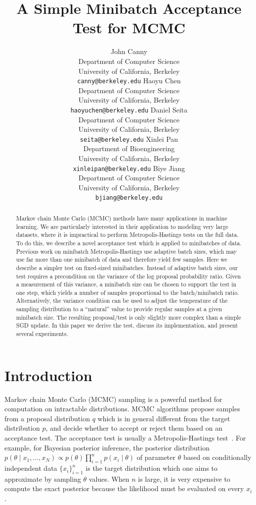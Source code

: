 \documentclass{article}
\title{A Simple Minibatch Acceptance Test for MCMC}
\author{
  John Canny \\
  Department of Computer Science \\
  University of California, Berkeley \\
  \texttt{canny@berkeley.edu}
  \And
  Haoyu Chen \\
  Department of Computer Science \\
  University of California, Berkeley \\
  \texttt{haoyuchen@berkeley.edu}
  \And
  Daniel Seita \\
  Department of Computer Science \\
  University of California, Berkeley \\
  \texttt{seita@berkeley.edu}
  \And
  Xinlei Pan \\
  Department of Bioengineering \\
  University of California, Berkeley \\
  \texttt{xinleipan@berkeley.edu}
  \And 
  Biye Jiang \\
  Department of Computer Science \\
  University of California, Berkeley \\
  \texttt{bjiang@berkeley.edu}
}
\begin{document}
\maketitle

\begin{abstract}
Markov chain Monte Carlo (MCMC) methods have many applications in
machine learning. We are particularly interested in their application
to modeling very large datasets, where it is impractical to
perform Metropolis-Hastings tests on the full data. To do this, we
describe a novel acceptance test which is applied to minibatches of
data. Previous work on minibatch Metropolis-Hastings use adaptive
batch sizes, which may use far more than one minibatch of data and therefore
yield few samples.  Here we describe a simpler test on fixed-sized
minibatches. Instead of adaptive batch sizes, our test requires a
precondition on the variance of the log proposal probability
ratio. Given a measurement of this variance, a minibatch size can be
chosen to support the test in one step, which yields a number of
samples proportional to the batch/minibatch ratio. Alternatively, the
variance condition can be used to adjust the temperature of the
sampling distribution to a ``natural'' value to provide regular
samples at a given minibatch size. The resulting proposal/test is only
slightly more complex than a simple SGD update. In this paper we
derive the test, discuss its implementation, and present several
experiments.
\end{abstract}



\section{Introduction}\label{sec:introduction}

Markov chain Monte Carlo (MCMC) sampling is a powerful method for
computation on intractable distributions. MCMC algorithms propose
samples from a proposal distribution $q$ which is in general different
from the target distribution $p$, and decide whether to accept or
reject them based on an acceptance test. The acceptance test is
usually a Metropolis-Hastings
test~\cite{Metropolis1953,hastings70}. For example, for Bayesian
posterior inference, the posterior distribution $p(\theta \mid x_1,
\ldots, x_N) \propto p(\theta)\prod_{i=1}^np(x_i \mid \theta)$ of
parameter $\theta$ based on conditionally independent data
$\{x_i\}_{i=1}^n$ is the target distribution which one aims to
approximate by sampling $\theta$ values. When $n$ is large, it is
very expensive to compute the exact posterior because the
likelihood must be evaluated on every $x_i$.
\end{document}

